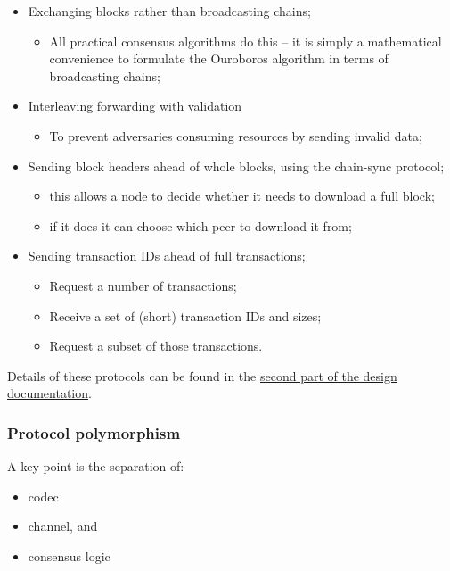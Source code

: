 \documentclass[11pt,a4paper]{article}
\begin{document}
\begin{itemize}
\item
  Exchanging blocks rather than broadcasting chains;

  \begin{itemize}
  \item
    All practical consensus algorithms do this -- it is simply a
    mathematical convenience to formulate the Ouroboros algorithm in
    terms of broadcasting chains;
  \end{itemize}
\item
  Interleaving forwarding with validation

  \begin{itemize}
  \item
    To prevent adversaries consuming resources by sending invalid data;
  \end{itemize}
\item
  Sending block headers ahead of whole blocks, using the chain-sync
  protocol;

  \begin{itemize}
  \item
    this allows a node to decide whether it needs to download a full
    block;
  \item
    if it does it can choose which peer to download it from;
  \end{itemize}
\item
  Sending transaction IDs ahead of full transactions;

  \begin{itemize}
  \item
    Request a number of transactions;
  \item
    Receive a set of (short) transaction IDs and sizes;
  \item
    Request a subset of those transactions.
  \end{itemize}
\end{itemize}

Details of these protocols can be found in the
\href{https://input-output-hk.github.io/ouroboros-network/pdfs/network-spec}{{second
part of the design documentation}}.

\subsubsection{Protocol polymorphism}
\label{protocol-polymorphism}

A key point is the separation of:

\begin{itemize}
\item
  codec
\item
  channel, and
\item
  consensus logic
\end{itemize}
\end{document}
